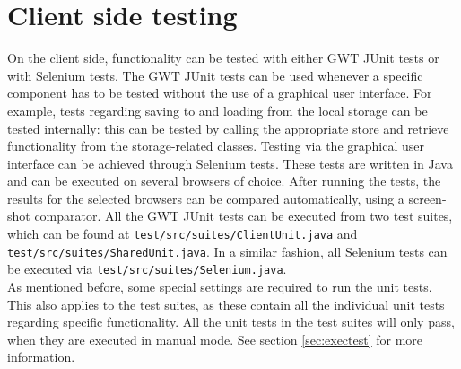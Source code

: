 \section{Client side testing}\label{sec:clientProc}
On the client side, functionality can be tested with either GWT JUnit tests or with Selenium tests. The GWT JUnit tests can be used whenever a specific component has to be tested without the use of a graphical user interface. For example, tests regarding saving to and loading from the local storage can be tested internally: this can be tested by calling the appropriate store and retrieve functionality from the storage-related classes. Testing via the graphical user interface can be achieved through Selenium tests. These tests are written in Java and can be executed on several browsers of choice. After running the tests, the results for the selected browsers can be compared automatically, using a screen-shot comparator.
All the GWT JUnit tests can be executed from two test suites, which can be found at \texttt{test/src/suites/ClientUnit.java} and \texttt{test/src/suites/SharedUnit.java}. In a similar fashion, all Selenium tests can be executed via \texttt{test/src/suites/Selenium.java}. \\
As mentioned before, some special settings are required to run the unit tests. This also applies to the test suites, as these contain all the individual unit tests regarding specific functionality. All the unit tests in the test suites will only pass, when they are executed in manual mode. See section \ref{sec:exectest} for more information.


